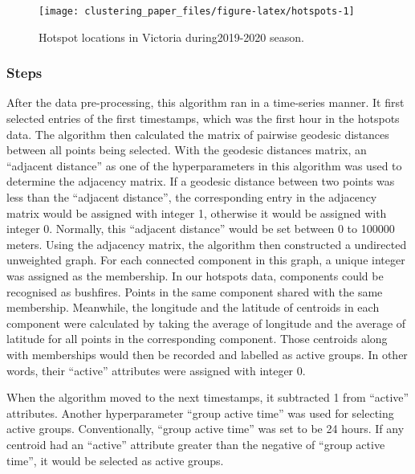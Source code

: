 \begin{Schunk}
\begin{figure}
\texttt{[image: clustering\_paper\_files/figure-latex/hotspots-1]} \caption[Hotspot locations in Victoria during2019-2020 season]{Hotspot locations in Victoria during2019-2020 season.}\label{fig:hotspots}
\end{figure}
\end{Schunk}

\hypertarget{steps}{%
\subsubsection{Steps}\label{steps}}

After the data pre-processing, this algorithm ran in a time-series
manner. It first selected entries of the first timestamps, which was the
first hour in the hotspots data. The algorithm then calculated the
matrix of pairwise geodesic distances between all points being selected.
With the geodesic distances matrix, an ``adjacent distance'' as one of
the hyperparameters in this algorithm was used to determine the
adjacency matrix. If a geodesic distance between two points was less
than the ``adjacent distance'', the corresponding entry in the adjacency
matrix would be assigned with integer 1, otherwise it would be assigned
with integer 0. Normally, this ``adjacent distance'' would be set
between 0 to 100000 meters. Using the adjacency matrix, the algorithm
then constructed a undirected unweighted graph. For each connected
component in this graph, a unique integer was assigned as the
membership. In our hotspots data, components could be recognised as
bushfires. Points in the same component shared with the same membership.
Meanwhile, the longitude and the latitude of centroids in each component
were calculated by taking the average of longitude and the average of
latitude for all points in the corresponding component. Those centroids
along with memberships would then be recorded and labelled as active
groups. In other words, their ``active'' attributes were assigned with
integer 0.

When the algorithm moved to the next timestamps, it subtracted 1 from
``active'' attributes. Another hyperparameter ``group active time'' was
used for selecting active groups. Conventionally, ``group active time''
was set to be 24 hours. If any centroid had an ``active'' attribute
greater than the negative of ``group active time'', it would be selected
as active groups.

